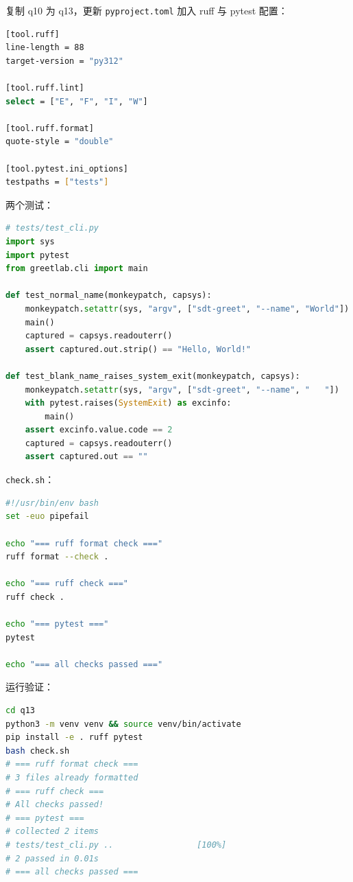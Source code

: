 \documentclass[a4paper,11pt]{ctexart}
\begin{document}
复制 q10 为 q13，更新 \texttt{pyproject.toml} 加入 ruff 与 pytest 配置：

\begin{lstlisting}[language=bash]
[tool.ruff]
line-length = 88
target-version = "py312"

[tool.ruff.lint]
select = ["E", "F", "I", "W"]

[tool.ruff.format]
quote-style = "double"

[tool.pytest.ini_options]
testpaths = ["tests"]
\end{lstlisting}

两个测试：

\begin{lstlisting}[language=Python]
# tests/test_cli.py
import sys
import pytest
from greetlab.cli import main

def test_normal_name(monkeypatch, capsys):
    monkeypatch.setattr(sys, "argv", ["sdt-greet", "--name", "World"])
    main()
    captured = capsys.readouterr()
    assert captured.out.strip() == "Hello, World!"

def test_blank_name_raises_system_exit(monkeypatch, capsys):
    monkeypatch.setattr(sys, "argv", ["sdt-greet", "--name", "   "])
    with pytest.raises(SystemExit) as excinfo:
        main()
    assert excinfo.value.code == 2
    captured = capsys.readouterr()
    assert captured.out == ""
\end{lstlisting}

\texttt{check.sh}：

\begin{lstlisting}[language=bash]
#!/usr/bin/env bash
set -euo pipefail

echo "=== ruff format check ==="
ruff format --check .

echo "=== ruff check ==="
ruff check .

echo "=== pytest ==="
pytest

echo "=== all checks passed ==="
\end{lstlisting}

运行验证：

\begin{lstlisting}[language=bash]
cd q13
python3 -m venv venv && source venv/bin/activate
pip install -e . ruff pytest
bash check.sh
# === ruff format check ===
# 3 files already formatted
# === ruff check ===
# All checks passed!
# === pytest ===
# collected 2 items
# tests/test_cli.py ..                 [100%]
# 2 passed in 0.01s
# === all checks passed ===
\end{lstlisting}
\end{document}
